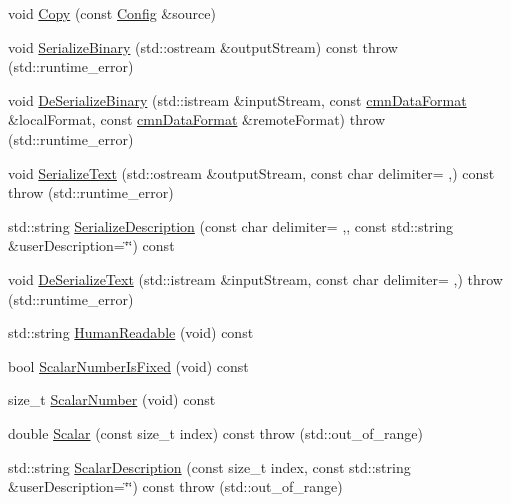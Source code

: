 \begin{DoxyCompactItemize}
\item 
void \hyperlink{classsvl_filter_source_video_capture_types_1_1_config_ac818f164fdddfd98751c86ed2d5bb7f2}{Copy} (const \hyperlink{classsvl_filter_source_video_capture_types_1_1_config}{Config} \&source)
\item 
void \hyperlink{classsvl_filter_source_video_capture_types_1_1_config_ad16b74558d897858416cc5b4a4eea9bf}{Serialize\+Binary} (std\+::ostream \&output\+Stream) const   throw (std\+::runtime\+\_\+error)
\item 
void \hyperlink{classsvl_filter_source_video_capture_types_1_1_config_a40bbf0c83f28355bb883e092e8592fb3}{De\+Serialize\+Binary} (std\+::istream \&input\+Stream, const \hyperlink{classcmn_data_format}{cmn\+Data\+Format} \&local\+Format, const \hyperlink{classcmn_data_format}{cmn\+Data\+Format} \&remote\+Format)  throw (std\+::runtime\+\_\+error)
\item 
void \hyperlink{classsvl_filter_source_video_capture_types_1_1_config_abc2c0142079b290b2680346b7b1f4e10}{Serialize\+Text} (std\+::ostream \&output\+Stream, const char delimiter= \textquotesingle{},\textquotesingle{}) const   throw (std\+::runtime\+\_\+error)
\item 
std\+::string \hyperlink{classsvl_filter_source_video_capture_types_1_1_config_a947b1edb033336b74d8d8d7343afaed8}{Serialize\+Description} (const char delimiter= \textquotesingle{},\textquotesingle{}, const std\+::string \&user\+Description=\char`\"{}\char`\"{}) const 
\item 
void \hyperlink{classsvl_filter_source_video_capture_types_1_1_config_a21f1e84466f18ed2ac11a06b6ba5e8eb}{De\+Serialize\+Text} (std\+::istream \&input\+Stream, const char delimiter= \textquotesingle{},\textquotesingle{})  throw (std\+::runtime\+\_\+error)
\item 
std\+::string \hyperlink{classsvl_filter_source_video_capture_types_1_1_config_af205f9ed5f63bd5efc41a0a5d4625b50}{Human\+Readable} (void) const 
\item 
bool \hyperlink{classsvl_filter_source_video_capture_types_1_1_config_a292ad08109ee5eea2ed25310018ee01d}{Scalar\+Number\+Is\+Fixed} (void) const 
\item 
size\+\_\+t \hyperlink{classsvl_filter_source_video_capture_types_1_1_config_a34f1bd01e7545dcc37c25d71e91e82cb}{Scalar\+Number} (void) const 
\item 
double \hyperlink{classsvl_filter_source_video_capture_types_1_1_config_a291e2c8628ba8d172670d4ab4f737220}{Scalar} (const size\+\_\+t index) const   throw (std\+::out\+\_\+of\+\_\+range)
\item 
std\+::string \hyperlink{classsvl_filter_source_video_capture_types_1_1_config_adf13117f2e4e61a9d27a6be9f8ead615}{Scalar\+Description} (const size\+\_\+t index, const std\+::string \&user\+Description=\char`\"{}\char`\"{}) const   throw (std\+::out\+\_\+of\+\_\+range)
\end{DoxyCompactItemize}
